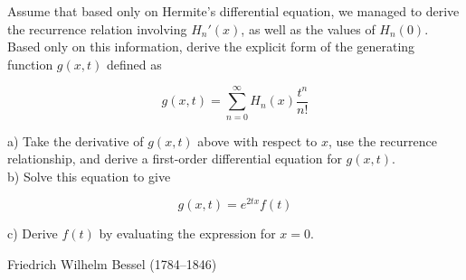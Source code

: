 \begin{sidebar}
\begin{ex}
Assume that based only on Hermite's differential equation, we managed to derive the recurrence relation involving $H_n'(x)$, as well as the values of $H_n(0)$. Based only on this information, derive the explicit form of the generating function $g(x,t)$ defined as

$$g(x,t) = \sum_{n = 0}^{\infty} H_n(x)\frac{t^n}{n!} $$

a) Take the derivative of $g(x,t)$ above with respect to $x$, use the recurrence relationship, and derive a first-order differential equation for $g(x,t)$.\\

b) Solve this equation to give

$$g(x,t) = e^{2tx} f(t)$$

c) Derive $f(t)$ by evaluating the expression for $x=0$.
\end{ex}
\end{sidebar}

\pagebreak
Friedrich Wilhelm Bessel (1784--1846)



